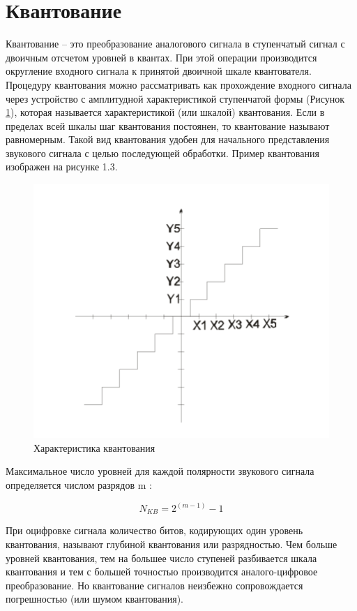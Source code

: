 \documentclass[12pt,a4paper,oneside]{report}
\begin{document}
\section{Квантование}
\quad
Квантование – это преобразование аналогового сигнала в ступенчатый сигнал с двоичным отсчетом уровней в квантах\cite{four}. При этой операции производится округление входного сигнала к принятой двоичной шкале квантователя. Процедуру квантования можно рассматривать как прохождение входного сигнала через устройство с амплитудной характеристикой ступенчатой формы (Рисунок \ref{ris:quant}), которая называется характеристикой (или шкалой) квантования. Если в пределах всей шкалы шаг квантования постоянен, то квантование называют равномерным. Такой вид квантования удобен для начального представления звукового сигнала с целью последующей обработки.
Пример квантования изображен на рисунке 1.3.
\clearpage
\begin{figure}[!htbp]
	\centering
	\includegraphics[scale=0.7]{quant.png}
	\caption{Характеристика квантования}
	\label{ris:quant}
\end{figure}

Максимальное число уровней для каждой полярности звукового сигнала определяется числом разрядов m :

\begin{equation}
	N_{KB} = 2^{(m-1)} - 1
	\label{eq:ref}
\end{equation}


При оцифровке сигнала количество битов, кодирующих один уровень квантования, называют глубиной квантования или разрядностью. Чем больше уровней квантования, тем на большее число ступеней разбивается шкала квантования и тем с большей точностью производится аналого-цифровое преобразование\cite{eight}. Но квантование сигналов неизбежно сопровождается погрешностью (или шумом квантования).
\end{document}
